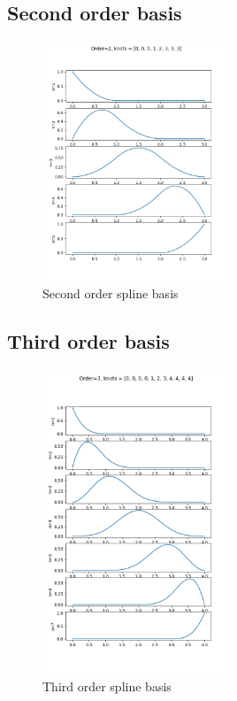 \documentclass{article}
\begin{document}
\clearpage


\subsection{Second order basis}

\begin{figure}[hbt]
  \centering\includegraphics[width=0.5\textwidth]{./figures/spline_basis_2}
  \caption{Second order spline basis}
  \label{fig:spline_basis_2}  
\end{figure}

\subsection{Third order basis}

\begin{figure}[hbt]
  \centering\includegraphics[width=0.5\textwidth]{./figures/spline_basis_3}
  \caption{Third order spline basis}
  \label{fig:spline_basis_3}  
\end{figure}
\end{document}
